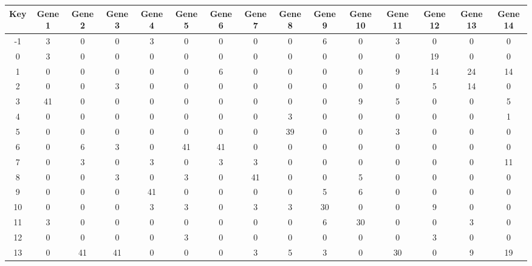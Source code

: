 \begin{tabular}{|c|c|c|c|c|c|c|c|c|c|c|c|c|c|c|}
\hline
Key & Gene 1 & Gene 2 & Gene 3 & Gene 4 & Gene 5 & Gene 6 & Gene 7 & Gene 8 & Gene 9 & Gene 10 & Gene 11 & Gene 12 & Gene 13 & Gene 14 \\
\hline
-1 & 3 & 0 & 0 & 3 & 0 & 0 & 0 & 0 & 6 & 0 & 3 & 0 & 0 & 0 \\
0 & 3 & 0 & 0 & 0 & 0 & 0 & 0 & 0 & 0 & 0 & 0 & 19 & 0 & 0 \\
1 & 0 & 0 & 0 & 0 & 0 & 6 & 0 & 0 & 0 & 0 & 9 & 14 & 24 & 14 \\
2 & 0 & 0 & 3 & 0 & 0 & 0 & 0 & 0 & 0 & 0 & 0 & 5 & 14 & 0 \\
3 & 41 & 0 & 0 & 0 & 0 & 0 & 0 & 0 & 0 & 9 & 5 & 0 & 0 & 5 \\
4 & 0 & 0 & 0 & 0 & 0 & 0 & 0 & 3 & 0 & 0 & 0 & 0 & 0 & 1 \\
5 & 0 & 0 & 0 & 0 & 0 & 0 & 0 & 39 & 0 & 0 & 3 & 0 & 0 & 0 \\
6 & 0 & 6 & 3 & 0 & 41 & 41 & 0 & 0 & 0 & 0 & 0 & 0 & 0 & 0 \\
7 & 0 & 3 & 0 & 3 & 0 & 3 & 3 & 0 & 0 & 0 & 0 & 0 & 0 & 11 \\
8 & 0 & 0 & 3 & 0 & 3 & 0 & 41 & 0 & 0 & 5 & 0 & 0 & 0 & 0 \\
9 & 0 & 0 & 0 & 41 & 0 & 0 & 0 & 0 & 5 & 6 & 0 & 0 & 0 & 0 \\
10 & 0 & 0 & 0 & 3 & 3 & 0 & 3 & 3 & 30 & 0 & 0 & 9 & 0 & 0 \\
11 & 3 & 0 & 0 & 0 & 0 & 0 & 0 & 0 & 6 & 30 & 0 & 0 & 3 & 0 \\
12 & 0 & 0 & 0 & 0 & 3 & 0 & 0 & 0 & 0 & 0 & 0 & 3 & 0 & 0 \\
13 & 0 & 41 & 41 & 0 & 0 & 0 & 3 & 5 & 3 & 0 & 30 & 0 & 9 & 19 \\
\hline
\end{tabular}